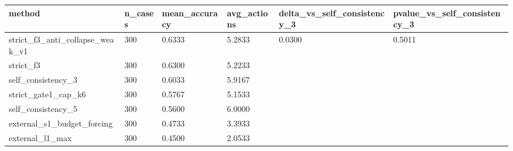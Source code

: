 \begin{tabular}{llllll}
\hline
method & n\_cases & mean\_accuracy & avg\_actions & delta\_vs\_self\_consistency\_3 & pvalue\_vs\_self\_consistency\_3 \\
\hline
strict\_f3\_anti\_collapse\_weak\_v1 & 300 & 0.6333 & 5.2833 & 0.0300 & 0.5011 \\
strict\_f3 & 300 & 0.6300 & 5.2233 &  &  \\
self\_consistency\_3 & 300 & 0.6033 & 5.9167 &  &  \\
strict\_gate1\_cap\_k6 & 300 & 0.5767 & 5.1533 &  &  \\
self\_consistency\_5 & 300 & 0.5600 & 6.0000 &  &  \\
external\_s1\_budget\_forcing & 300 & 0.4733 & 3.3933 &  &  \\
external\_l1\_max & 300 & 0.4500 & 2.0533 &  &  \\
\hline
\end{tabular}
